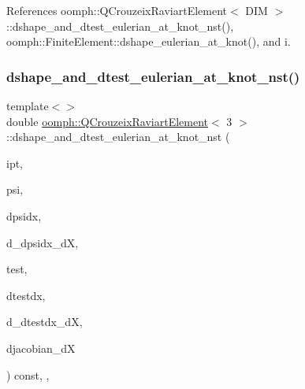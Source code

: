 References oomph\+::\+Q\+Crouzeix\+Raviart\+Element$<$ D\+I\+M $>$\+::dshape\+\_\+and\+\_\+dtest\+\_\+eulerian\+\_\+at\+\_\+knot\+\_\+nst(), oomph\+::\+Finite\+Element\+::dshape\+\_\+eulerian\+\_\+at\+\_\+knot(), and i.

\mbox{\label{classoomph_1_1QCrouzeixRaviartElement_a31e6429e9b705412f687b0304c2fd93b}} 
\subsubsection{\texorpdfstring{dshape\+\_\+and\+\_\+dtest\+\_\+eulerian\+\_\+at\+\_\+knot\+\_\+nst()}{dshape\_and\_dtest\_eulerian\_at\_knot\_nst()}\hspace{0.1cm}{\footnotesize\ttfamily [4/4]}}
{\footnotesize\ttfamily template$<$$>$ \\
double \hyperlink{classoomph_1_1QCrouzeixRaviartElement}{oomph\+::\+Q\+Crouzeix\+Raviart\+Element}$<$ 3 $>$\+::dshape\+\_\+and\+\_\+dtest\+\_\+eulerian\+\_\+at\+\_\+knot\+\_\+nst (\begin{DoxyParamCaption}\item[{const unsigned \&}]{ipt,  }\item[{\hyperlink{classoomph_1_1Shape}{Shape} \&}]{psi,  }\item[{\hyperlink{classoomph_1_1DShape}{D\+Shape} \&}]{dpsidx,  }\item[{\hyperlink{classoomph_1_1RankFourTensor}{Rank\+Four\+Tensor}$<$ double $>$ \&}]{d\+\_\+dpsidx\+\_\+dX,  }\item[{\hyperlink{classoomph_1_1Shape}{Shape} \&}]{test,  }\item[{\hyperlink{classoomph_1_1DShape}{D\+Shape} \&}]{dtestdx,  }\item[{\hyperlink{classoomph_1_1RankFourTensor}{Rank\+Four\+Tensor}$<$ double $>$ \&}]{d\+\_\+dtestdx\+\_\+dX,  }\item[{\hyperlink{classoomph_1_1DenseMatrix}{Dense\+Matrix}$<$ double $>$ \&}]{djacobian\+\_\+dX }\end{DoxyParamCaption}) const\hspace{0.3cm}{\ttfamily [inline]}, {\ttfamily [protected]}, {\ttfamily [virtual]}}


